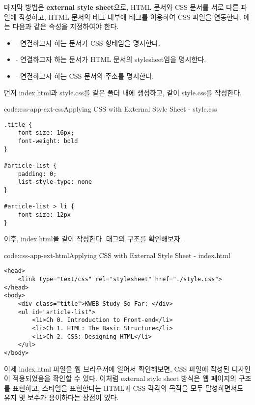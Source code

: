 마지막 방법은 \textbf{external style sheet}으로, HTML 문서와 CSS 문서를 서로 다른 파일에 작성하고, HTML 문서의  태그 내부에  태그를 이용하여 CSS 파일을 연동한다. 에는 다음과 같은 속성을 지정하여야 한다.

\begin{itemize}
    \item {} - 연결하고자 하는 문서가 CSS 형태임을 명시한다.
    \item {} - 연결하고자 하는 문서가 HTML 문서의 stylesheet임을 명시한다.
    \item {} - 연결하고자 하는 CSS 문서의 주소를 명시한다.
\end{itemize}

먼저 index.html과 style.css를 같은 폴더 내에 생성하고, \와 같이 style.css를 작성한다.

\begin{codeenv}{code:css-app-ext-css}{Applying CSS with External Style Sheet - style.css}\begin{verbatim}
.title {
    font-size: 16px;
    font-weight: bold
}

#article-list {
    padding: 0;
    list-style-type: none
}

#article-list > li {
    font-size: 12px
}
\end{verbatim}
\end{codeenv}

이후, index.html을 \과 같이 작성한다.  태그의 구조를 확인해보자.

\begin{codeenv}{code:css-app-ext-html}{Applying CSS with External Style Sheet - index.html}\begin{verbatim}
<head>
    <link type="text/css" rel="stylesheet" href="./style.css">
</head>
<body>
    <div class="title">KWEB Study So Far: </div>
    <ul id="article-list">
        <li>Ch 0. Introduction to Front-end</li>
        <li>Ch 1. HTML: The Basic Structure</li>
        <li>Ch 2. CSS: Designing HTML</li>
    </ul>
</body>
\end{verbatim}
\end{codeenv}

이제 index.html 파일을 웹 브라우저에 열어서 확인해보면, CSS 파일에 작성된 디자인이 적용되었음을 확인할 수 있다. 이처럼 external style sheet 방식은 웹 페이지의 구조를 표현하고, 스타일을 표현한다는 HTML과 CSS 각각의 목적을 모두 달성하면서도 유지 및 보수가 용이하다는 장점이 있다.
